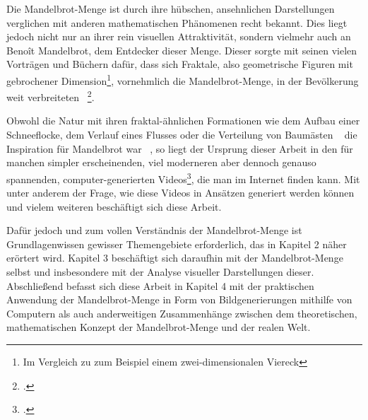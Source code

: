 
Die Mandelbrot-Menge ist durch ihre hübschen, ansehnlichen Darstellungen verglichen
mit anderen mathematischen Phänomenen recht bekannt.
Dies liegt jedoch nicht nur an ihrer rein visuellen Attraktivität,
sondern vielmehr auch an Benoît Mandelbrot, dem Entdecker dieser Menge.
Dieser sorgte mit seinen vielen Vorträgen und Büchern dafür, dass sich Fraktale,
also geometrische Figuren mit gebrochener Dimension\footnote{
  Im Vergleich zu zum Beispiel einem zwei-dimensionalen Viereck
},
vornehmlich die Mandelbrot-Menge, in der Bevölkerung weit verbreiteten
~\footcite[Vgl. letzten Absatz]{ibm_fractal_2011}.

Obwohl die Natur mit ihren fraktal-ähnlichen Formationen wie dem Aufbau einer
Schneeflocke, dem Verlauf eines Flusses oder die Verteilung von Baumästen
~\cite{nnart_fractals_nodate} die Inspiration für Mandelbrot war
~\cite{zink_kosmische_2014}, so liegt der Ursprung dieser Arbeit in den für
manchen simpler erscheinenden, viel moderneren aber dennoch genauso spannenden,
computer-generierten Videos\footcite[Vgl. bspw.][]{maths_town_eye_2017},
die man im Internet finden kann.
Mit unter anderem der Frage, wie diese Videos in Ansätzen generiert werden können
und vielem weiteren beschäftigt sich diese Arbeit.

Dafür jedoch und zum vollen Verständnis der Mandelbrot-Menge ist Grundlagenwissen
gewisser Themengebiete erforderlich, das in Kapitel 2 näher erörtert wird.
Kapitel 3 beschäftigt sich daraufhin mit der Mandelbrot-Menge selbst und insbesondere
mit der Analyse visueller Darstellungen dieser.
Abschließend befasst sich diese Arbeit in Kapitel 4 mit der praktischen Anwendung
der Mandelbrot-Menge in Form von Bildgenerierungen mithilfe von Computern als auch
anderweitigen Zusammenhänge zwischen dem theoretischen, mathematischen Konzept
der Mandelbrot-Menge und der realen Welt.